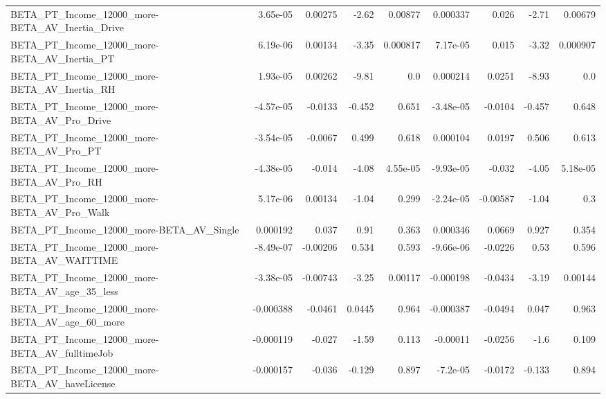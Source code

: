 \begin{tabular}{lrrrrrrrr}
BETA\_PT\_Income\_12000\_more-BETA\_AV\_Inertia\_Drive    &    3.65e-05 &      0.00275 &    -2.62 &  0.00877 &   0.000337 &       0.026 &        -2.71 &       0.00679 \\
BETA\_PT\_Income\_12000\_more-BETA\_AV\_Inertia\_PT       &    6.19e-06 &      0.00134 &    -3.35 & 0.000817 &   7.17e-05 &       0.015 &        -3.32 &      0.000907 \\
BETA\_PT\_Income\_12000\_more-BETA\_AV\_Inertia\_RH       &    1.93e-05 &      0.00262 &    -9.81 &      0.0 &   0.000214 &      0.0251 &        -8.93 &           0.0 \\
BETA\_PT\_Income\_12000\_more-BETA\_AV\_Pro\_Drive        &   -4.57e-05 &      -0.0133 &   -0.452 &    0.651 &  -3.48e-05 &     -0.0104 &       -0.457 &         0.648 \\
BETA\_PT\_Income\_12000\_more-BETA\_AV\_Pro\_PT           &   -3.54e-05 &      -0.0067 &    0.499 &    0.618 &   0.000104 &      0.0197 &        0.506 &         0.613 \\
BETA\_PT\_Income\_12000\_more-BETA\_AV\_Pro\_RH           &   -4.38e-05 &       -0.014 &    -4.08 & 4.55e-05 &  -9.93e-05 &      -0.032 &        -4.05 &      5.18e-05 \\
BETA\_PT\_Income\_12000\_more-BETA\_AV\_Pro\_Walk         &    5.17e-06 &      0.00134 &    -1.04 &    0.299 &  -2.24e-05 &    -0.00587 &        -1.04 &           0.3 \\
BETA\_PT\_Income\_12000\_more-BETA\_AV\_Single           &    0.000192 &        0.037 &     0.91 &    0.363 &   0.000346 &      0.0669 &        0.927 &         0.354 \\
BETA\_PT\_Income\_12000\_more-BETA\_AV\_WAITTIME         &   -8.49e-07 &     -0.00206 &    0.534 &    0.593 &  -9.66e-06 &     -0.0226 &         0.53 &         0.596 \\
BETA\_PT\_Income\_12000\_more-BETA\_AV\_age\_35\_less      &   -3.38e-05 &     -0.00743 &    -3.25 &  0.00117 &  -0.000198 &     -0.0434 &        -3.19 &       0.00144 \\
BETA\_PT\_Income\_12000\_more-BETA\_AV\_age\_60\_more      &   -0.000388 &      -0.0461 &   0.0445 &    0.964 &  -0.000387 &     -0.0494 &        0.047 &         0.963 \\
BETA\_PT\_Income\_12000\_more-BETA\_AV\_fulltimeJob      &   -0.000119 &       -0.027 &    -1.59 &    0.113 &   -0.00011 &     -0.0256 &         -1.6 &         0.109 \\
BETA\_PT\_Income\_12000\_more-BETA\_AV\_haveLicense      &   -0.000157 &       -0.036 &   -0.129 &    0.897 &   -7.2e-05 &     -0.0172 &       -0.133 &         0.894 \\

\end{tabular}
